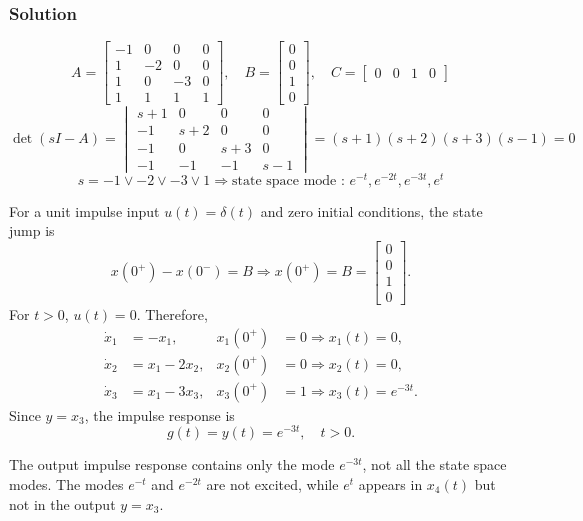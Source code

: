 \documentclass[12pt,a4paper]{article}
\begin{document}
	\subsubsection*{Solution}
	
	\[
	A = \begin{bmatrix}
		-1 & 0 & 0 & 0 \\
		1 & -2 & 0 & 0 \\
		1 & 0 & -3 & 0 \\
		1 & 1 & 1 & 1
	\end{bmatrix}, \quad B = \begin{bmatrix}
	0 \\ 0 \\ 1 \\ 0
	\end{bmatrix}, \quad C = \begin{bmatrix}	
	0 & 0 & 1 & 0 
	\end{bmatrix}
	\]
	\[
	\det(sI - A) = \begin{vmatrix}
		s + 1 & 0 & 0 & 0 \\
		-1 & s + 2 & 0 & 0 \\
		-1 & 0 & s + 3 & 0 \\
		-1 & -1 & -1 & s -1 
	\end{vmatrix} = (s + 1)(s +2 )(s+3)(s-1)  =0
	\]
	\[
	s = -1 \lor -2 \lor -3 \lor 1 \Rightarrow \text{state space mode : } e^{-t}, e^{-2t}, e^{-3t}, e^t
	\]
	
	For a unit impulse input $u(t)=\delta(t)$ and zero initial conditions, the state jump is
	\[
	x(0^+) - x(0^-) = B \Rightarrow x(0^+) = B = \begin{bmatrix} 0 \\ 0 \\ 1 \\ 0 \end{bmatrix}.
	\]
	For $t>0$, $u(t)=0$. Therefore,
	\begin{align*}
	\dot{x}_1 &= -x_1, & x_1(0^+) &= 0 \Rightarrow x_1(t)=0, \\
	\dot{x}_2 &= x_1-2x_2, & x_2(0^+) &= 0 \Rightarrow x_2(t)=0, \\
	\dot{x}_3 &= x_1-3x_3, & x_3(0^+) &= 1 \Rightarrow x_3(t)=e^{-3t}.
	\end{align*}
	Since $y=x_3$, the impulse response is
	\[
	g(t)=y(t)=e^{-3t}, \quad t>0.
	\]
	
	The output impulse response contains only the mode $e^{-3t}$, not all the state space modes. The modes $e^{-t}$ and $e^{-2t}$ are not excited, while $e^t$ appears in $x_4(t)$ but not in the output $y=x_3$.
\end{document}
